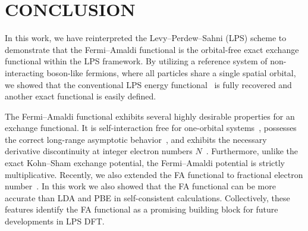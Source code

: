 \documentclass[%
 reprint,
 amsmath,amssymb,
 aps,
pra,
]{revtex4-2}
\begin{document}



\section{CONCLUSION}

In this work, we have reinterpreted the Levy--Perdew--Sahni (LPS) scheme to demonstrate that the Fermi--Amaldi functional is the orbital-free exact exchange functional within the LPS framework. By utilizing a reference system of non-interacting boson-like fermions, where all particles share a single spatial orbital, we showed that the conventional LPS energy functional~\cite{Levy.1984.PRA.30.2745} is fully recovered and another exact functional is easily defined.

The Fermi--Amaldi functional exhibits several highly desirable properties for an exchange functional. It is self-interaction free for one-orbital systems~\cite{Bosko.2023.JCP.159.131101, Ayers.2005.MP.103.2061}, possesses the correct long-range asymptotic behavior~\cite{Ayers.2005.MP.103.2061}, and exhibits the necessary derivative discontinuity at integer electron numbers $N$~\cite{Bosko.2025.JCP.163.054108}. Furthermore, unlike the exact Kohn--Sham exchange potential, the Fermi--Amaldi potential is strictly multiplicative. Recently, we also extended the FA functional to fractional electron number~\cite{Bosko.2025.JCP.163.054108}. In this work we also showed that the FA functional can be more accurate than LDA and PBE in self-consistent calculations. Collectively, these features identify the FA functional as a promising building block for future developments in LPS DFT.
\end{document}

